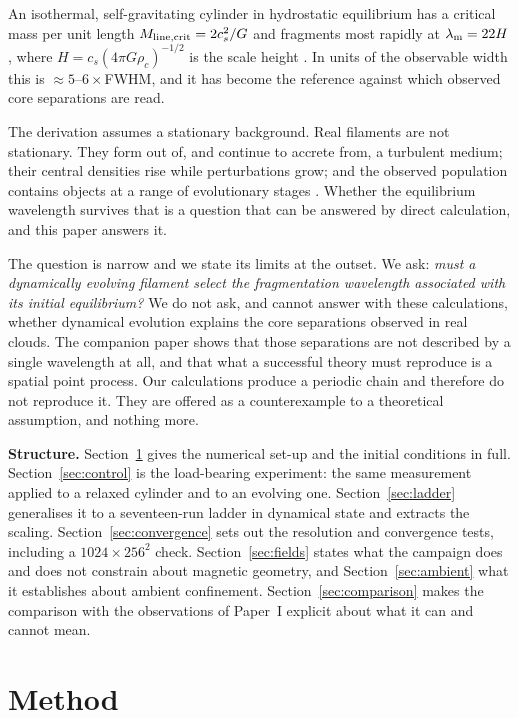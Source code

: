 \documentclass[usenatbib,twoside,twocolumn]{mnras}
\begin{document}
An isothermal, self-gravitating cylinder in hydrostatic equilibrium has a critical mass per unit length $M_{\rm line,crit}=2c_s^2/G$ \citep{Ostriker1964} and fragments most rapidly at $\lambda_{\rm m}=22H$, where $H=c_s(4\pi G\rho_c)^{-1/2}$ is the scale height \citep{Inutsuka1992,Nagasawa1987,Fischera2012}. In units of the observable width this is $\approx5$--$6\times$FWHM, and it has become the reference against which observed core separations are read.

The derivation assumes a stationary background. Real filaments are not stationary. They form out of, and continue to accrete from, a turbulent medium; their central densities rise while perturbations grow; and the observed population contains objects at a range of evolutionary stages \citep{Andre2014,Clarke2016,Clarke2017,Clarke2020}. Whether the equilibrium wavelength survives that is a question that can be answered by direct calculation, and this paper answers it.

The question is narrow and we state its limits at the outset. We ask: \emph{must a dynamically evolving filament select the fragmentation wavelength associated with its initial equilibrium?} We do not ask, and cannot answer with these calculations, whether dynamical evolution explains the core separations observed in real clouds. The companion paper \citep{PaperI} shows that those separations are not described by a single wavelength at all, and that what a successful theory must reproduce is a spatial point process. Our calculations produce a periodic chain and therefore do not reproduce it. They are offered as a counterexample to a theoretical assumption, and nothing more.

\smallskip\noindent\textbf{Structure.} Section~\ref{sec:method} gives the numerical set-up and the initial conditions in full. Section~\ref{sec:control} is the load-bearing experiment: the same measurement applied to a relaxed cylinder and to an evolving one. Section~\ref{sec:ladder} generalises it to a seventeen-run ladder in dynamical state and extracts the scaling. Section~\ref{sec:convergence} sets out the resolution and convergence tests, including a $1024\times256^2$ check. Section~\ref{sec:fields} states what the campaign does and does not constrain about magnetic geometry, and Section~\ref{sec:ambient} what it establishes about ambient confinement. Section~\ref{sec:comparison} makes the comparison with the observations of Paper~I explicit about what it can and cannot mean.

\section{Method}
\label{sec:method}
\end{document}
